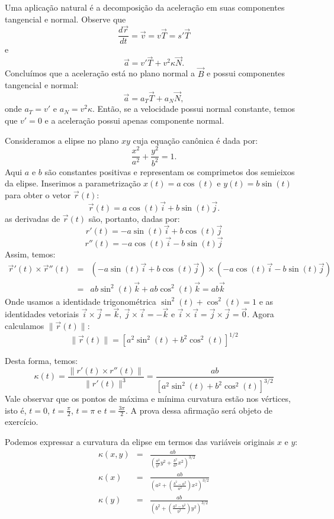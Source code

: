 \begin{obs}Uma aplicação natural é a decomposição da aceleração em suas componentes tangencial e normal. Observe que
$$
\frac{d\vec{r}}{dt}=\vec{v}=v\vec{T}=s' \vec{T}
$$
e
$$
\vec{a}=v' \vec{T}+v^2 \kappa \vec{N}.
$$
Concluímos que a aceleração está no plano normal a $\vec{B}$ e possui componentes tangencial e normal:
$$
\vec{a}=a_T \vec{T}+a_N \vec{N},
$$
onde $a_T=v'$ e $a_N=v^2\kappa$. Então, se a velocidade possui normal constante, temos que $v'=0$ e a aceleração possui apenas componente normal.

\end{obs}

\begin{ex} \label{ex_calculo_curvatura_elipse}Consideramos a elipse no plano $xy$ cuja equação canônica é dada por:
  $$\frac{x^2}{a^2} + \frac{y^2}{b^2} = 1. $$
  Aqui $a$ e $b$ são constantes positivas e representam os comprimetos dos semieixos da elipse.
  Inserimos a parametrização $x(t)=a\cos(t)$ e $y(t)=b\sin(t)$ para obter o vetor $\vec{r}(t)$:
  $$\vec{r}(t) = a\cos(t)\vec{i} + b\sin(t)\vec{j}.$$
  as derivadas de $\vec{r}(t)$ são, portanto, dadas por:
$$r'(t)=-a\sin(t)\vec{i}+b\cos(t)\vec{j}$$  
$$r''(t)=-a\cos(t)\vec{i}-b\sin(t)\vec{j}$$
Assim, temos:
\begin{eqnarray*}\vec{r}'(t)\times\vec{r}''(t)&=&\left(-a\sin(t)\vec{i}+b\cos(t)\vec{j}\right)\times\left(-a\cos(t)\vec{i}-b\sin(t)\vec{j}\right)\\
&=&ab\sin^2(t)\vec{k}+ab\cos^2(t)\vec{k}=ab\vec{k}
\end{eqnarray*}
Onde usamos a identidade trigonométrica $\sin^2(t)+\cos^2(t)=1$ e as identidades vetoriais $\vec{i}\times\vec{j}=\vec{k}$, $\vec{j}\times\vec{i}=-\vec{k}$  e $\vec{i}\times\vec{i}=\vec{j}\times\vec{j}=\vec{0}$.
Agora calculamos $\|\vec{r}(t)\|$:
$$\|\vec{r}(t)\|=\left[a^2\sin^2(t)+b^2\cos^2(t)\right]^{1/2}$$

Desta forma, temos:
$$\kappa(t)=\frac{\|r'(t)\times r''(t)\|}{\|r'(t)\|^3}=\frac{ab}{\left[a^2\sin^2(t)+b^2\cos^2(t)\right]^{3/2}}$$
Vale observar que os pontos de máxima e mínima curvatura estão nos vértices, isto é, $t=0$, $t=\frac{\pi}{2}$, $t=\pi$ e $t=\frac{3\pi}{2}$. A prova dessa afirmação será objeto de exercício.

Podemos expressar a curvatura da elipse em termos das variáveis originais $x$ e $y$:
\begin{eqnarray*}
\kappa(x, y)&=&\frac{ab}{\left(\frac{a^2}{b^2}y^2+\frac{b^2}{a^2}x^2\right)^{3/2}}\\
\kappa(x)&=&\frac{ab}{\left(a^2+\left(\frac{b^2-a^2}{a^2}\right)x^2\right)^{3/2}}\\
\kappa(y)&=&\frac{ab}{\left(b^2+\left(\frac{a^2-b^2}{b^2}\right)y^2\right)^{3/2}}\\
\end{eqnarray*}
\end{ex} 


